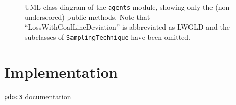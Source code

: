 \begin{figure}
{
    }
    \caption{UML class diagram of the \texttt{agents} module, showing only the (non-underscored) public methods. Note that ``LossWithGoalLineDeviation'' is abbreviated as LWGLD and the subclasses of \texttt{SamplingTechnique} have been omitted.}
\end{figure}


\section{Implementation}
\todo

\texttt{pdoc3} documentation